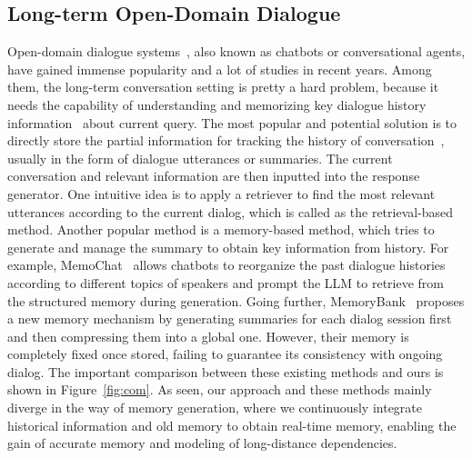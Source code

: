 \documentclass[authoryear,preprint,review,12pt]{elsarticle}
\begin{document}
\subsection{Long-term Open-Domain Dialogue}
Open-domain dialogue systems~\citep{liu-etal-2016-evaluate, zhang-etal-2018-personalizing,Kann2022OpendomainDG}, also known as chatbots or conversational agents, have gained immense popularity and a lot of studies in recent years.
Among them, the long-term conversation setting is pretty a hard problem, because it needs the capability of understanding and memorizing key dialogue history information~\citep{wu-etal-2022-memformer,2022TongZhangHierarchical} about current query. The most popular and potential solution is to directly store the partial information for tracking the history of conversation~\citep{Lee2023PromptedLA}, usually in the form of dialogue utterances or summaries. The current conversation and relevant information are then inputted into the response generator. One intuitive idea is to apply a retriever to find the most relevant utterances according to the current dialog, which is called as the retrieval-based method. Another popular method is a memory-based method, which tries to generate and manage the summary to obtain key information from history. For example, MemoChat~\citep{Lu2023MemoChatTL} allows chatbots to reorganize the past dialogue histories according to different topics of speakers and prompt the LLM to retrieve from the structured memory during generation. Going further, MemoryBank~\citep{Zhong2023MemoryBankEL} proposes a new memory mechanism by generating summaries for each dialog session first and then compressing them into a global one. However, their memory is completely fixed once stored, failing to guarantee its consistency with ongoing dialog. The important comparison between these existing methods and ours is shown in Figure~\ref{fig:com}. As seen, our approach and these methods mainly diverge in the way of memory generation, where we continuously integrate historical information and old memory to obtain real-time memory, enabling the gain of accurate memory and modeling of long-distance dependencies. 
\end{document}
